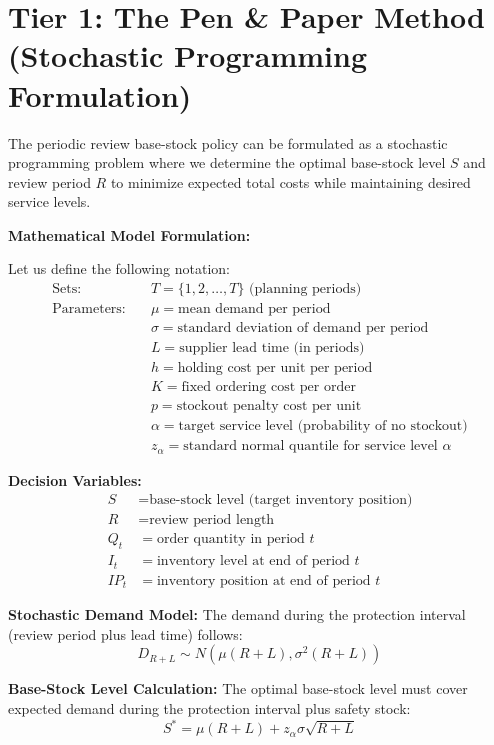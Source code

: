 \documentclass{article}
\begin{document}
\section{Tier 1: The Pen \& Paper Method (Stochastic Programming Formulation)}

The periodic review base-stock policy can be formulated as a stochastic programming problem where we determine the optimal base-stock level $S$ and review period $R$ to minimize expected total costs while maintaining desired service levels.

\textbf{Mathematical Model Formulation:}

Let us define the following notation:
\begin{align}
\text{Sets:} \quad &T = \{1, 2, \ldots, T\} \text{ (planning periods)}\\
\text{Parameters:} \quad &\mu = \text{mean demand per period}\\
&\sigma = \text{standard deviation of demand per period}\\
&L = \text{supplier lead time (in periods)}\\
&h = \text{holding cost per unit per period}\\
&K = \text{fixed ordering cost per order}\\
&p = \text{stockout penalty cost per unit}\\
&\alpha = \text{target service level (probability of no stockout)}\\
&z_{\alpha} = \text{standard normal quantile for service level } \alpha
\end{align}

\textbf{Decision Variables:}
\begin{align}
S &= \text{base-stock level (target inventory position)}\\
R &= \text{review period length}\\
Q_t &= \text{order quantity in period } t\\
I_t &= \text{inventory level at end of period } t\\
IP_t &= \text{inventory position at end of period } t
\end{align}

\textbf{Stochastic Demand Model:}
The demand during the protection interval (review period plus lead time) follows:
\begin{equation}
D_{R+L} \sim N(\mu(R+L), \sigma^2(R+L))
\end{equation}

\textbf{Base-Stock Level Calculation:}
The optimal base-stock level must cover expected demand during the protection interval plus safety stock:
\begin{equation}
S^* = \mu(R+L) + z_{\alpha} \sigma \sqrt{R+L}
\end{equation}
\end{document}
